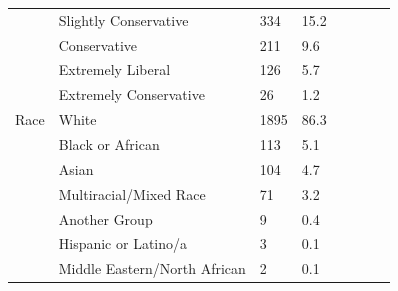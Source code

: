 \begin{table}[H]
\begin{tabular}{llllllll}
  & Slightly Conservative & 334 & 15.2 &  &  &  &  \\
  & Conservative & 211 & 9.6 &  &  &  &  \\
  & Extremely Liberal & 126 & 5.7 &  &  &  &  \\
  & Extremely Conservative & 26 & 1.2 &  &  &  &  \\
Race & White & 1895 & 86.3 &  &  &  &  \\
  & Black or African & 113 & 5.1 &  &  &  &  \\
  & Asian & 104 & 4.7 &  &  &  &  \\
  & Multiracial/Mixed Race & 71 & 3.2 &  &  &  &  \\
  & Another Group & 9 & 0.4 &  &  &  &  \\
  & Hispanic or Latino/a & 3 & 0.1 &  &  &  &  \\
  & Middle Eastern/North African & 2 & 0.1 &  &  &  &  \\
\hline
\end{tabular}
\end{table}

